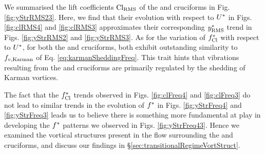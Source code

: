 \documentclass[oneside]{utmthesis}
\begin{document}
We summarised the \rms{} lift coefficients $\text{Cl}_{\text{RMS}}$ of the \angfo{} and \angth{} cruciforms in Fig. \ref{fig:yStrRMS23}. Here, we find that their evolution with respect to $U^{*}$ in Figs. \ref{fig:clRMS4} and \ref{fig:clRMS3} approximates their corresponding $y^{*}_{\text{RMS}}$ trend in Figs. \ref{fig:yStrRMS2} and \ref{fig:yStrRMS3}. As for the variation of $f_{\text{Cl}}^{*}$ with respect to $U^{*}$, for both the \angfo{} and \angth{} cruciforms, both exhibit outstanding similarity to $f_{v,\text{Karman}}$ of Eq. \ref{eq:karmanSheddingFreq}. This trait hints that vibrations resulting from the \angfo{} and \angth{} cruciforms are primarily regulated by the shedding of Karman vortices.

The fact that the $f_{\text{Cl}}^{*}$ trends observed in Figs. \ref{fig:clFreq4} and \ref{fig:clFreq3} do not lead to similar trends in the evolution of $f^{*}$ in Figs. \ref{fig:yStrFreq4} and \ref{fig:yStrFreq3} leads us to believe there is something more fundamental at play in developing the $f^{*}$ patterns we observed in Figs. \ref{fig:yStrFreq43}. Hence we examined the vortical structures present in the flow surrounding the \angfo{} and \angth{} cruciforms, and discuss our findings in \S\ref{sec:transitionalRegimeVortStruct}. 
\end{document}
